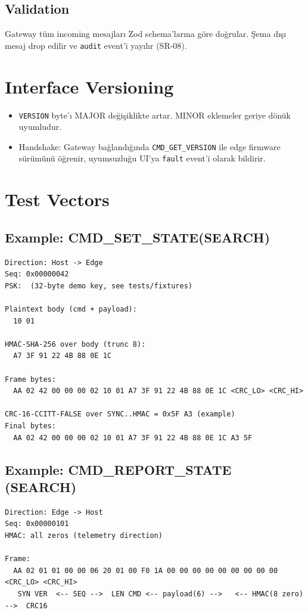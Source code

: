 \documentclass[11pt, a4paper]{article}
\begin{document}
\subsection{Validation}
Gateway tüm incoming mesajları Zod schema'larına göre doğrular. Şema dışı mesaj drop edilir ve \texttt{audit} event'i yayılır (SR-08).

\section{Interface Versioning}
\begin{itemize}
    \item \texttt{VERSION} byte'ı MAJOR değişiklikte artar. MINOR eklemeler geriye dönük uyumludur.
    \item Handshake: Gateway bağlandığında \texttt{CMD\_GET\_VERSION} ile edge firmware sürümünü öğrenir, uyumsuzluğu UI'ya \texttt{fault} event'i olarak bildirir.
\end{itemize}

\section{Test Vectors}
\subsection{Example: CMD\_SET\_STATE(SEARCH)}
\begin{lstlisting}
Direction: Host -> Edge
Seq: 0x00000042
PSK:  (32-byte demo key, see tests/fixtures)

Plaintext body (cmd + payload):
  10 01

HMAC-SHA-256 over body (trunc 8):
  A7 3F 91 22 4B 88 0E 1C

Frame bytes:
  AA 02 42 00 00 00 02 10 01 A7 3F 91 22 4B 88 0E 1C <CRC_LO> <CRC_HI>

CRC-16-CCITT-FALSE over SYNC..HMAC = 0x5F A3 (example)
Final bytes:
  AA 02 42 00 00 00 02 10 01 A7 3F 91 22 4B 88 0E 1C A3 5F
\end{lstlisting}

\subsection{Example: CMD\_REPORT\_STATE (SEARCH)}
\begin{lstlisting}
Direction: Edge -> Host
Seq: 0x00000101
HMAC: all zeros (telemetry direction)

Frame:
  AA 02 01 01 00 00 06 20 01 00 F0 1A 00 00 00 00 00 00 00 00 00 <CRC_LO> <CRC_HI>
   SYN VER  <-- SEQ -->  LEN CMD <-- payload(6) -->   <-- HMAC(8 zero) -->  CRC16
\end{lstlisting}
\end{document}
